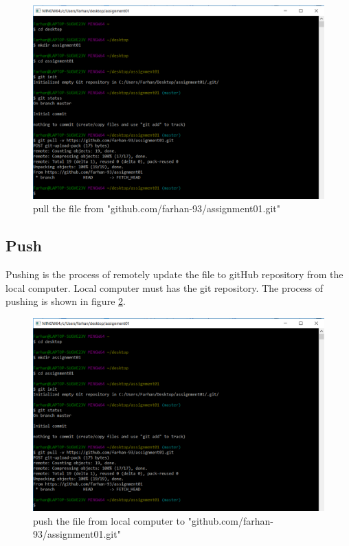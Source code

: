 \documentclass[paper=a4, fontsize=12pt]{scrartcl}
\numberwithin{equation}{section} %
\numberwithin{figure}{section} %
\numberwithin{table}{section} %
\begin{document}
\begin{figure}
\includegraphics[width=\linewidth]{pull.png}
\caption{pull the file from "github.com/farhan-93/assignment01.git"}
\label{cpull}
\end{figure}




\subsection{Push}
Pushing is the process of remotely update the file to gitHub repository from the local computer. Local computer must has the git repository. The process of pushing is shown in figure \ref{cpush}.




\begin{figure}
\includegraphics[width=\linewidth]{pull.png}
\caption{push the file from local computer to "github.com/farhan-93/assignment01.git"}
\label{cpush}
\end{figure}


\end{document}
